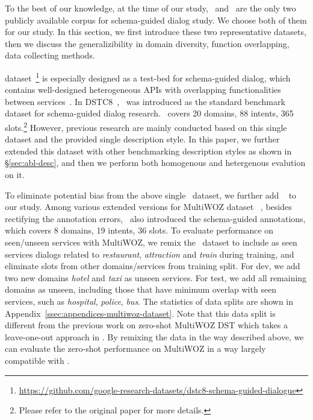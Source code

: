 To the best of our knowledge, at the time of our study, \sgdst~and
\multiwoz~are the only two publicly available corpus for schema-guided
dialog study. We choose both of them for our study. In this section,
we first introduce these two representative datasets, then we discuss
the generalizibility in domain diversity, function overlapping, data
collecting methods.

\sgdst
dataset~\footnote{\url{https://github.com/google-research-datasets/dstc8-schema-guided-dialogue}}
is especially designed as a test-bed for schema-guided dialog, which
contains well-designed heterogeneous APIs with overlapping
functionalities between services~\cite{rastogi2019towards}. In
DSTC8~\cite{rastogi2020schema}, \sgdst~was introduced as the standard
benchmark dataset for schema-guided dialog research. \sgdst~covers 20
domains, 88 intents, 365 slots.\footnote{Please refer to the original
  paper for more details.} However, previous research are mainly
conducted based on this single dataset and the provided single
description style. In this paper, we further extended this dataset
with other benchmarking description styles as shown in
\S\ref{sec:abl-desc}, and then we perform both homogenous and
hetergenous evalution on it.

To eliminate potential bias from the above single \sgdst~dataset, we
further add \multiwoz~\cite{zang-etal-2020-multiwoz} to our study.
Among various extended versions for MultiWOZ
dataset~\cite[2.0-2.3,][]{budzianowski2018multiwoz,
  eric2020multiwoz,zang-etal-2020-multiwoz,han2020multiwoz} , besides
rectifying the annotation errors, \multiwoz ~also introduced the
schema-guided annotations, which covers 8 domains, 19 intents, 36
slots.  To evaluate performance on seen/unseen services with MultiWOZ,
we remix the \multiwoz~dataset to include as seen services dialogs
related to \textit{restaurant}, \textit{attraction} and \textit{train}
during training, and eliminate slots from other domains/services from
training split.  For dev, we add two new domains {\it hotel} and {\it
  taxi} as unseen services. For test, we add all remaining domains as
unseen, including those that have minimum overlap with seen services,
such as {\it hospital}, {\it police}, {\it bus}. The statistics of
data splits are shown in
Appendix~\ref{ssec:appendices-multiwoz-dataset}. Note that this data
split is different from the previous work on zero-shot MultiWOZ DST
which takes a leave-one-out approach in \citet{wu2019transferable}. By
remixing the data in the way described above, we can evaluate the
zero-shot performance on MultiWOZ in a way largely compatible with
\sgdst.

